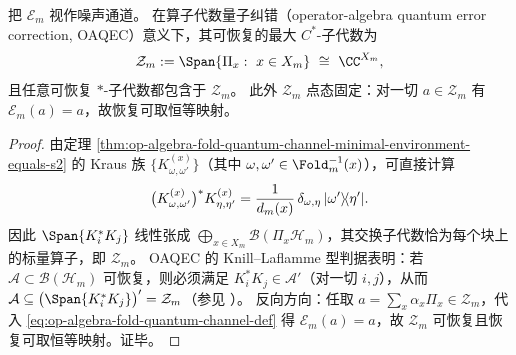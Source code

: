 \begin{proposition}\label{prop:op-algebra-fold-quantum-channel-max-recoverable-algebra}
把 \(\mathcal{E}_m\) 视作噪声通道。
在算子代数量子纠错（operator-algebra quantum error correction, OAQEC）意义下，其可恢复的最大 \(C^\ast\)-子代数为
\[
\mathcal{Z}_m:=\Span\{\Pi_x:\ x\in X_m\}\ \cong\ \CC^{X_m},
\]
且任意可恢复 \(\ast\)-子代数都包含于 \(\mathcal{Z}_m\)。
此外 \(\mathcal{Z}_m\) 点态固定：对一切 \(a\in\mathcal{Z}_m\) 有 \(\mathcal{E}_m(a)=a\)，故恢复可取恒等映射。
\end{proposition}
\begin{proof}
由定理 \ref{thm:op-algebra-fold-quantum-channel-minimal-environment-equals-s2} 的 Kraus 族 \(\{K^{(x)}_{\omega,\omega'}\}\)（其中 \(\omega,\omega'\in\Fold_m^{-1}(x)\)），可直接计算
\[
\bigl(K^{(x)}_{\omega,\omega'}\bigr)^\ast K^{(x)}_{\eta,\eta'}
=\frac{1}{d_m(x)}\,\delta_{\omega,\eta}\,\lvert \omega'\rangle\!\langle \eta'\rvert.
\]
因此 \(\Span\{K_i^\ast K_j\}\) 线性张成
\(
\bigoplus_{x\in X_m}\mathcal{B}(\Pi_x\mathcal{H}_m)
\)，其交换子代数恰为每个块上的标量算子，即 \(\mathcal{Z}_m\)。
OAQEC 的 Knill--Laflamme 型判据表明：若 \(\mathcal{A}\subset\mathcal{B}(\mathcal{H}_m)\) 可恢复，则必须满足 \(K_i^\ast K_j\in \mathcal{A}'\)（对一切 \(i,j\)），从而 \(\mathcal{A}\subseteq \bigl(\Span\{K_i^\ast K_j\}\bigr)'=\mathcal{Z}_m\)（参见 \cite{DauphinaisKribsVasmer2024StabilizerFormalismOAQEC}）。
反向方向：任取 \(a=\sum_x \alpha_x\Pi_x\in\mathcal{Z}_m\)，代入 \eqref{eq:op-algebra-fold-quantum-channel-def} 得 \(\mathcal{E}_m(a)=a\)，故 \(\mathcal{Z}_m\) 可恢复且恢复可取恒等映射。证毕。
\end{proof}


